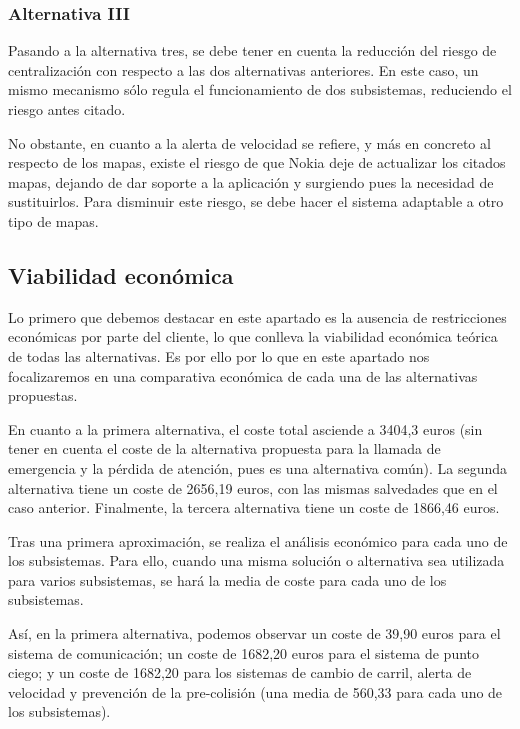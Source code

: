 \subsubsection{Alternativa III}
\par Pasando a la alternativa tres, se debe tener en cuenta la reducción del riesgo de centralización con respecto a las dos alternativas anteriores. En este caso, un mismo mecanismo sólo regula el funcionamiento de dos subsistemas, reduciendo el riesgo antes citado.

\par No obstante, en cuanto a la alerta de velocidad se refiere, y más en concreto al respecto de los mapas, existe el riesgo de que Nokia deje de actualizar los citados mapas, dejando de dar soporte a la aplicación y surgiendo pues la necesidad de sustituirlos. Para disminuir este riesgo, se debe hacer el sistema adaptable a otro tipo de mapas.




\subsection{Viabilidad económica}

\par Lo primero que debemos destacar en este apartado es la ausencia de restricciones económicas por parte del cliente, lo que conlleva la viabilidad económica teórica de todas las alternativas. Es por ello por lo que en este apartado nos focalizaremos en una comparativa económica de cada una de las alternativas propuestas.

\par  En cuanto a la primera alternativa, el coste total asciende a 3404,3 euros (sin tener en cuenta el coste de la alternativa propuesta para la llamada de emergencia y la pérdida de atención, pues es una alternativa común). La segunda alternativa tiene un coste de 2656,19 euros, con las mismas salvedades que en el caso anterior. Finalmente, la tercera alternativa tiene un coste de 1866,46 euros.

\par  Tras una primera aproximación, se realiza el análisis económico para cada uno de los subsistemas. Para ello, cuando una misma solución o alternativa sea utilizada para varios subsistemas, se hará la media de coste para cada uno de los subsistemas.

\par Así, en la primera alternativa, podemos observar un coste de 39,90 euros para el sistema de comunicación; un coste de 1682,20 euros para el sistema de punto ciego; y un coste de  1682,20 para los sistemas de cambio de carril, alerta de velocidad y prevención de la pre-colisión (una media de 560,33 para cada uno de los subsistemas).

